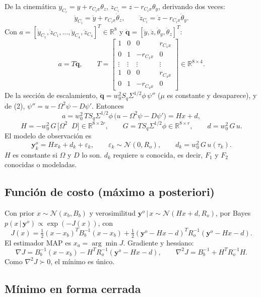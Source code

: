 De la cinemática $y_{C_i}=y+r_{C_ix}\theta_z$, $z_{C_i}=z-r_{C_ix}\theta_y$, derivando dos veces:
\[
\ddot y_{C_i}=\ddot y+r_{C_ix}\ddot\theta_z,\qquad
\ddot z_{C_i}=\ddot z-r_{C_ix}\ddot\theta_y.
\]
Con $a=[\ddot y_{C_1},\ddot z_{C_1},\dots,\ddot y_{C_4},\ddot z_{C_4}]^T\in\mathbb R^8$ y $\ddot{\mathbf q}=[\ddot y,\ddot z,\ddot\theta_y,\ddot\theta_z]^T$:
\[
a=T\ddot{\mathbf q},\qquad
T=\begin{bmatrix}
1&0&0&r_{C_1x}\\0&1&-r_{C_1x}&0\\
\vdots&\vdots&\vdots&\vdots\\
1&0&0&r_{C_4x}\\0&1&-r_{C_4x}&0
\end{bmatrix}\in\mathbb R^{8\times4}.
\]
De la sección de escalamiento, $\ddot{\mathbf q}=w_0^2S_q\Sigma^{1/2}\phi\,\psi''$ ($\mu$ es constante y desaparece), y de (2), $\psi''=u-\Omega^2\psi-D\psi'$. Entonces
\[
a=w_0^2\,TS_q\Sigma^{1/2}\phi\,\big(u-\Omega^2\psi-D\psi'\big)=Hx+d,
\]
\[
H=-w_0^2\,G\,\big[\Omega^2\;\;D\big]\in\mathbb R^{8\times2r},\qquad
G=TS_q\Sigma^{1/2}\phi\in\mathbb R^{8\times r},\qquad
d=w_0^2\,G\,u .
\]
El modelo de observación es
\[
\mathbf y^o_k=Hx_k+d_k+\varepsilon_k,\qquad \varepsilon_k\sim\mathcal N(0,R_o),\qquad d_k=w_0^2\,G\,u(\tau_k).
\]
$H$ es constante si $\Omega$ y $D$ lo son. $d_k$ requiere $u$ conocida, es decir, $F_1$ y $F_2$ conocidas o modeladas.

\subsection{Función de costo (máximo a posteriori)}

Con prior $x\sim\mathcal N(x_b,B_b)$ y verosimilitud $\mathbf y^o\,|\,x\sim\mathcal N(Hx+d,R_o)$, por Bayes $p(x\,|\,\mathbf y^o)\propto\exp(-J(x))$, con
\[
J(x)=\tfrac12(x-x_b)^TB_b^{-1}(x-x_b)+\tfrac12(\mathbf y^o-Hx-d)^TR_o^{-1}(\mathbf y^o-Hx-d).
\]
El estimador MAP es $x_a=\arg\min J$. Gradiente y hessiano:
\[
\nabla J=B_b^{-1}(x-x_b)-H^TR_o^{-1}(\mathbf y^o-Hx-d),\qquad
\nabla^2J=B_b^{-1}+H^TR_o^{-1}H .
\]
Como $\nabla^2J\succ0$, el mínimo es único.

\subsection{Mínimo en forma cerrada}

